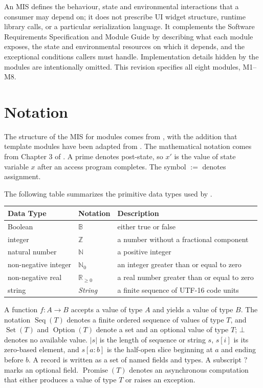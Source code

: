 \documentclass[12pt, titlepage]{article}
\begin{document}
An MIS defines the behaviour, state and environmental interactions that
a consumer may depend on; it does not prescribe UI widget structure,
runtime library calls, or a particular serialization language.
It complements the Software Requirements Specification and Module Guide by
describing what each module exposes, the state and environmental resources on
which it depends, and the exceptional conditions callers must handle.
Implementation details hidden by the modules are intentionally omitted.
This revision specifies all eight modules, M1--M8.

\section{Notation}

The structure of the MIS for modules comes from \citet{HoffmanAndStrooper1995},
with the addition that template modules have been adapted from
\citet{GhezziEtAl2003}.  The mathematical notation comes from Chapter 3 of
\citet{HoffmanAndStrooper1995}.  A prime denotes post-state, so $x'$ is the
value of state variable $x$ after an access program completes.  The symbol
$:=$ denotes assignment.

The following table summarizes the primitive data types used by \progname. 

\begin{center}
\renewcommand{\arraystretch}{1.2}
\noindent 
\begin{tabular}{l l p{7.5cm}}
\toprule 
\textbf{Data Type} & \textbf{Notation} & \textbf{Description}\\ 
\midrule
Boolean & $\mathbb{B}$ & either true or false\\
integer & $\mathbb{Z}$ & a number without a fractional component\\
natural number & $\mathbb{N}$ & a positive integer\\
non-negative integer & $\mathbb{N}_0$ & an integer greater than or equal to zero\\
non-negative real & $\mathbb{R}_{\geq 0}$ & a real number greater than or equal to zero\\
string & \textit{String} & a finite sequence of UTF-16 code units\\
\bottomrule
\end{tabular}
\end{center}

\noindent
A function $f : A \rightarrow B$ accepts a value of type $A$ and yields a
value of type $B$.  The notation $\operatorname{Seq}(T)$ denotes a finite
ordered sequence of values of type $T$, and $\operatorname{Set}(T)$ and
$\operatorname{Option}(T)$ denote a set and an optional value of type $T$;
$\bot$ denotes no available value.  $|s|$ is the length of sequence or string
$s$, $s[i]$ is its zero-based element, and $s[a:b]$ is the half-open slice
beginning at $a$ and ending before $b$.  A record is written as a set of named
fields and types.  A subscript $? $ marks an optional field.
$\operatorname{Promise}(T)$ denotes an asynchronous computation that either
produces a value of type $T$ or raises an exception.
\end{document}
